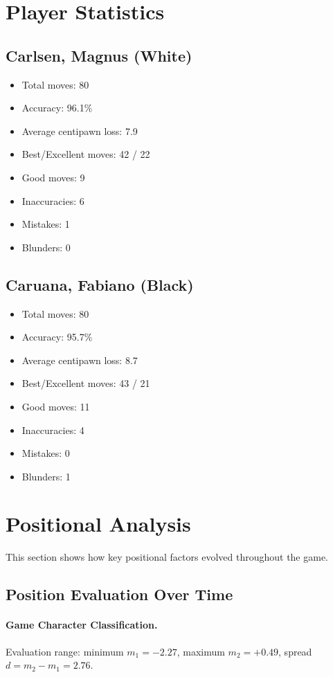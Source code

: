 \documentclass[11pt]{book}
\begin{document}
\section{Player Statistics}

\subsection{Carlsen, Magnus (White)}
\begin{itemize}
\item Total moves: 80
\item Accuracy: 96.1\%
\item Average centipawn loss: 7.9
\item Best/Excellent moves: 42 / 22
\item Good moves: 9
\item Inaccuracies: 6
\item Mistakes: 1
\item Blunders: 0
\end{itemize}

\subsection{Caruana, Fabiano (Black)}
\begin{itemize}
\item Total moves: 80
\item Accuracy: 95.7\%
\item Average centipawn loss: 8.7
\item Best/Excellent moves: 43 / 21
\item Good moves: 11
\item Inaccuracies: 4
\item Mistakes: 0
\item Blunders: 1
\end{itemize}

\section{Positional Analysis}

This section shows how key positional factors evolved throughout the game.

\subsection{Position Evaluation Over Time}

\paragraph{Game Character Classification.}
Evaluation range: minimum $m_1 = -2.27$, maximum $m_2 = +0.49$, spread $d = m_2 - m_1 = 2.76$.
\end{document}
